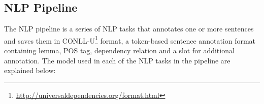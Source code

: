 \documentclass[conference,compsoc]{IEEEtran}
\begin{document}
%
%

\subsection{NLP Pipeline}

The NLP pipeline is a series of NLP tasks that annotates one or more sentences and saves them in CONLL-U\footnote{\url{http://universaldependencies.org/format.html}} format, a token-based sentence annotation format containing lemma, POS tag, dependency relation and a slot for additional annotation. The model used in each of the NLP tasks in the pipeline are explained below:
\end{document}
